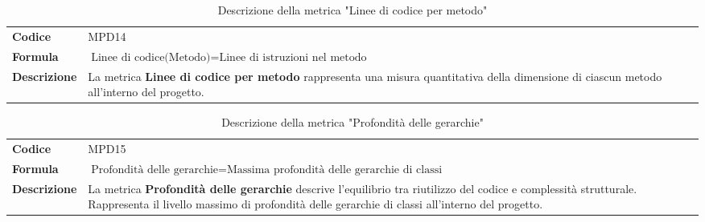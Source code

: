 \documentclass[a4paper,12pt]{article}
\begin{document}
        {\renewcommand{\arraystretch}{1.4}
            \begin{table}[H]
            \centering
            \begin{tabularx}{\textwidth}{|l|X|}
                \hline
                \rowcolor{gold}
                \multicolumn{2}{|c|}{\textbf{Linee di codice per metodo}}\\
                \hline
                \textbf{Codice} & MPD14 \\
                \hline
                \textbf{Formula} & \( \displaystyle \text{Linee di codice(Metodo)} = \text{Linee di istruzioni nel metodo} \)\\
                \hline
                \textbf{Descrizione} & La metrica \textbf{Linee di codice per metodo} rappresenta una misura quantitativa della dimensione di ciascun metodo all'interno del progetto. \\
                \hline
            \end{tabularx}      
            \caption{Descrizione della metrica "Linee di codice per metodo"}
            \end{table}
        }

        {\renewcommand{\arraystretch}{1.4}
            \begin{table}[H]
            \centering
            \begin{tabularx}{\textwidth}{|l|X|}
                \hline
                \rowcolor{gold}
                \multicolumn{2}{|c|}{\textbf{Profondità delle gerarchie}}\\
                \hline
                \textbf{Codice} & MPD15 \\
                \hline
                \textbf{Formula} & \( \displaystyle \text{Profondità delle gerarchie} = \text{Massima profondità delle gerarchie di classi} \)\\
                \hline
                \textbf{Descrizione} & La metrica \textbf{Profondità delle gerarchie} descrive l'equilibrio tra riutilizzo del codice e complessità strutturale. Rappresenta il livello massimo di profondità delle gerarchie di classi all'interno del progetto. \\
                \hline
            \end{tabularx}      
            \caption{Descrizione della metrica "Profondità delle gerarchie"}
            \end{table}
        }
    

                
\end{document}
